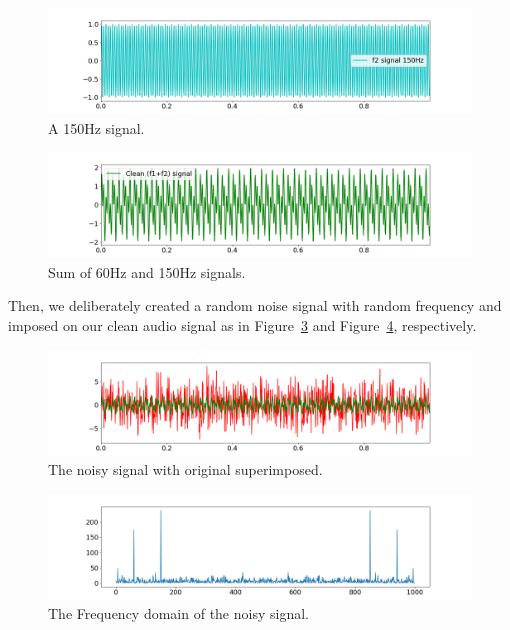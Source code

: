 \documentclass[a4paper, 12pt]{scrartcl}
\begin{document}
\begin{figure}[H] 
  \centering
  \includegraphics[width=\textwidth]{img/signal_150hz.png}
  \caption{A 150Hz signal.}
  \label{fig:onefifty}
\end{figure}

\begin{figure}[H] 
  \centering
  \includegraphics[width=\textwidth]{img/sum_signals.png}
  \caption{Sum of 60Hz and 150Hz signals.}
  \label{fig:sumsignals}
\end{figure}

Then, we deliberately created a random noise signal with random frequency and imposed on our clean audio signal as in Figure~\ref{fig:original_noisy} and Figure~\ref{fig:time_to_freq}, respectively.

\begin{figure}[H] 
  \centering
  \includegraphics[width=\textwidth]{img/original_noisy.png}
  \caption{The noisy signal with original superimposed.}
  \label{fig:original_noisy}
\end{figure}

\begin{figure}[H] 
  \centering
  \includegraphics[width=\textwidth]{img/time_to_freq.png}
  \caption{The Frequency domain of the noisy signal.}
  \label{fig:time_to_freq}
\end{figure}
\end{document}
